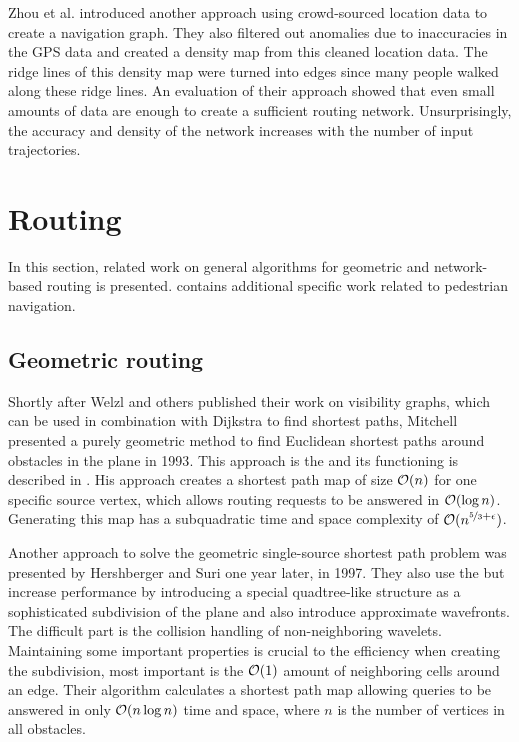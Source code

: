 		Zhou et al. introduced another approach using crowd-sourced location data to create a navigation graph\cite{zhou-crowd-sourced-navigation}.
		They also filtered out anomalies due to inaccuracies in the GPS data and created a density map from this cleaned location data.
		The ridge lines of this density map were turned into edges since many people walked along these ridge lines.
		An evaluation of their approach showed that even small amounts of data are enough to create a sufficient routing network.
		Unsurprisingly, the accuracy and density of the network increases with the number of input trajectories.
	
\section{Routing}

	In this section, related work on general algorithms for geometric and network-based routing is presented.
	 contains additional specific work related to pedestrian navigation.
	
	\subsection{Geometric routing}
	\label{subsec:related-work-geometric-routing}
	
		\label{related-work:mitchell}
		Shortly after Welzl and others published their work on visibility graphs, which can be used in combination with Dijkstra to find shortest paths, Mitchell presented a purely geometric method to find Euclidean shortest paths around obstacles in the plane in 1993\cite{mitchell-shortest-path}.
		This approach is the  and its functioning is described in .
		His approach creates a shortest path map of size $\mathcal{O}(n)$ for one specific source vertex, which allows routing requests to be answered in $\mathcal{O}(\log{n})$.
		Generating this map has a subquadratic time and space complexity of $\mathcal{O}(n^{\nicefrac{5}{3}+\epsilon})$.
		
		Another approach to solve the geometric single-source shortest path problem was presented by Hershberger and Suri one year later, in 1997\cite{hershberger-suri}.
		They also use the  but increase performance by introducing a special quadtree-like structure as a sophisticated subdivision of the plane and also introduce approximate wavefronts.
		The difficult part is the collision handling of non-neighboring wavelets.
		Maintaining some important properties is crucial to the efficiency when creating the subdivision, most important is the $\mathcal{O}(1)$ amount of neighboring cells around an edge.
		Their algorithm calculates a shortest path map allowing queries to be answered in only $\mathcal{O}(n \log n)$ time and space, where $n$ is the number of vertices in all obstacles.
		
